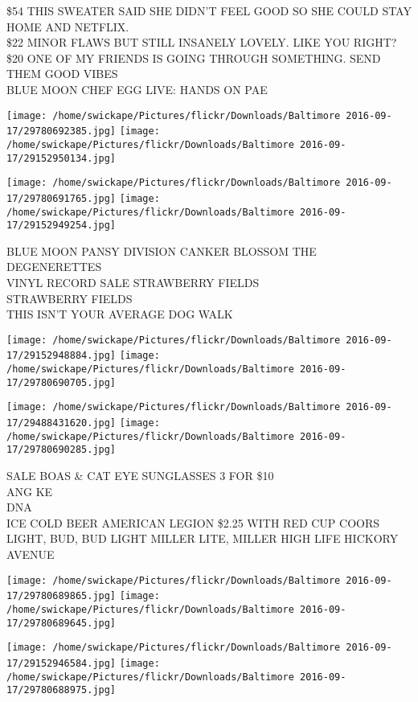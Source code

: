 \documentclass[10pt,letterpaper]{article}
\begin{document}
\$54 THIS SWEATER SAID SHE DIDN'T FEEL GOOD SO SHE COULD STAY HOME AND NETFLIX.\\
\$22 MINOR FLAWS BUT STILL INSANELY LOVELY.  LIKE YOU RIGHT?\\
\$20 ONE OF MY FRIENDS IS GOING THROUGH SOMETHING.  SEND THEM GOOD VIBES\\
BLUE MOON CHEF EGG LIVE: HANDS ON PAE
\pagebreak

\texttt{[image: /home/swickape/Pictures/flickr/Downloads/Baltimore 2016-09-17/29780692385.jpg]}
\texttt{[image: /home/swickape/Pictures/flickr/Downloads/Baltimore 2016-09-17/29152950134.jpg]}

\texttt{[image: /home/swickape/Pictures/flickr/Downloads/Baltimore 2016-09-17/29780691765.jpg]}
\texttt{[image: /home/swickape/Pictures/flickr/Downloads/Baltimore 2016-09-17/29152949254.jpg]}

BLUE MOON PANSY DIVISION CANKER BLOSSOM THE DEGENERETTES\\
VINYL RECORD SALE STRAWBERRY FIELDS\\
STRAWBERRY FIELDS\\
THIS ISN'T YOUR AVERAGE DOG WALK
\pagebreak

\texttt{[image: /home/swickape/Pictures/flickr/Downloads/Baltimore 2016-09-17/29152948884.jpg]}
\texttt{[image: /home/swickape/Pictures/flickr/Downloads/Baltimore 2016-09-17/29780690705.jpg]}

\texttt{[image: /home/swickape/Pictures/flickr/Downloads/Baltimore 2016-09-17/29488431620.jpg]}
\texttt{[image: /home/swickape/Pictures/flickr/Downloads/Baltimore 2016-09-17/29780690285.jpg]}

SALE BOAS \& CAT EYE SUNGLASSES 3 FOR \$10\\
ANG KE\\
DNA\\
ICE COLD BEER AMERICAN LEGION \$2.25 WITH RED CUP COORS LIGHT, BUD, BUD LIGHT MILLER LITE, MILLER HIGH LIFE HICKORY AVENUE
\pagebreak

\texttt{[image: /home/swickape/Pictures/flickr/Downloads/Baltimore 2016-09-17/29780689865.jpg]}
\texttt{[image: /home/swickape/Pictures/flickr/Downloads/Baltimore 2016-09-17/29780689645.jpg]}

\texttt{[image: /home/swickape/Pictures/flickr/Downloads/Baltimore 2016-09-17/29152946584.jpg]}
\texttt{[image: /home/swickape/Pictures/flickr/Downloads/Baltimore 2016-09-17/29780688975.jpg]}
\end{document}
